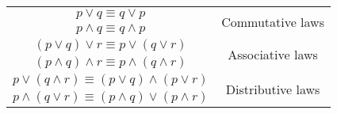 \documentclass{article}
\begin{document}
{\begin{center}
\begin{tabular}{|c|c|}
            \hline
            \hline
            $p \lor q \equiv q \lor p$                                                                & \multirow{2}{*}{Commutative laws}  \\
            $p \land q \equiv q \land p$                                                              &                                    \\
            \hline
            $\left(p \lor q\right) \lor r \equiv p \lor \left(q \lor r\right)$                        & \multirow{2}{*}{Associative laws}  \\
            $\left(p \land q\right) \land r \equiv p \land \left(q \land r\right)$                    &                                    \\
            \hline
            $p \lor \left(q \land r\right) \equiv \left(p \lor q\right) \land \left(p \lor r\right)$  & \multirow{2}{*}{Distributive laws} \\
            $p \land \left(q \lor r\right) \equiv \left(p \land q\right) \lor \left(p \land r\right)$ &                                    \\
            \hline
        \end{tabular}
    \end{center}
}
\end{document}
